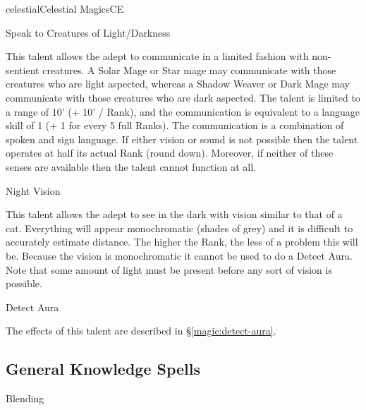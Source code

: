 \begin{college}[1.3]{celestial}{Celestial Magics}{CE}
\begin{talent}[T-1]{Speak to Creatures of Light/Darkness}
\begin{effects}
This talent allows the adept to communicate in a limited fashion with
non-sentient creatures.  A Solar Mage or Star mage may communicate
with those creatures who are light aspected, whereas a Shadow Weaver
or Dark Mage may communicate with those creatures who are dark
aspected.  The talent is limited to a range of 10' (+ 10' / Rank),
and the communication is equivalent to a language skill of 1 (+ 1 for
every 5 full Ranks).  The communication is a combination of spoken and
sign language.  If either vision or sound is not possible then the
talent operates at half its actual Rank (round down).  Moreover, if
neither of these senses are available then the talent cannot function
at all.
\end{effects}
\end{talent}

\begin{talent}[T-2]{Night Vision}

\begin{effects}
This talent allows the adept to see in the dark with vision similar to
that of a cat.  Everything will appear monochromatic (\ie shades of
grey) and it is difficult to accurately estimate distance.  The higher
the Rank, the less of a problem this will be.  Because the vision is
monochromatic it cannot be used to do a Detect Aura.  Note that some
amount of light must be present before any sort of vision is possible.
\end{effects}
\end{talent}

\begin{talent}[T-3]{Detect Aura}

\begin{effects}
The effects of this talent are described in \S \ref{magic:detect-aura}.
\end{effects}
\end{talent}

\subsection{General Knowledge Spells}

\begin{spell}[G-1]{Blending}


\end{spell}
\end{college}
